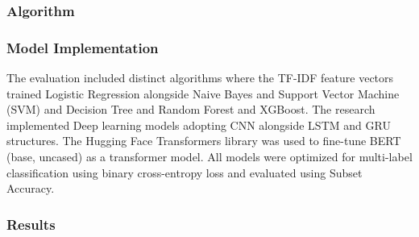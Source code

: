 \documentclass[pdflatex,sn-mathphys-num]{sn-jnl}%
\theoremstyle{thmstyleone}%
\theoremstyle{thmstyletwo}%
\theoremstyle{thmstylethree}%
\begin{document}




\subsubsection{Algorithm}

% 



\subsubsection{Model Implementation}

The evaluation included distinct algorithms where the TF-IDF feature vectors trained Logistic Regression alongside Naive Bayes and Support Vector Machine (SVM) and Decision Tree and Random Forest and XGBoost. The research implemented Deep learning models adopting CNN alongside LSTM and GRU structures. The Hugging Face Transformers library was used to fine-tune BERT (base, uncased) as a transformer model. All models were optimized for multi-label classification using binary cross-entropy loss and evaluated using Subset Accuracy.

\clearpage

\subsubsection{Results}
\end{document}
